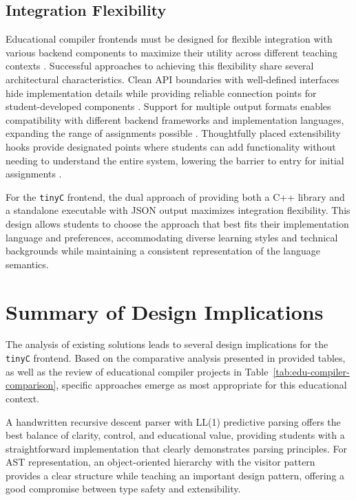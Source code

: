 \subsection{Integration Flexibility}

Educational compiler frontends must be designed for flexible integration with various backend components to maximize their utility across different teaching contexts \cite{jones1997minimal}. Successful approaches to achieving this flexibility share several architectural characteristics. Clean API boundaries with well-defined interfaces hide implementation details while providing reliable connection points for student-developed components \cite{jones1997minimal}. Support for multiple output formats enables compatibility with different backend frameworks and implementation languages, expanding the range of assignments possible \cite{lattner2004llvm}. Thoughtfully placed extensibility hooks provide designated points where students can add functionality without needing to understand the entire system, lowering the barrier to entry for initial assignments \cite{patel2021comparing}.

For the \texttt{tinyC} frontend, the dual approach of providing both a C++ library and a standalone executable with JSON output maximizes integration flexibility. This design allows students to choose the approach that best fits their implementation language and preferences, accommodating diverse learning styles and technical backgrounds while maintaining a consistent representation of the language semantics.

\section{Summary of Design Implications}

The analysis of existing solutions leads to several design implications for the \texttt{tinyC} frontend. Based on the comparative analysis presented in provided tables, as well as the review of educational compiler projects in Table~\ref{tab:edu-compiler-comparison}, specific approaches emerge as most appropriate for this educational context.

A handwritten recursive descent parser with LL(1) predictive parsing offers the best balance of clarity, control, and educational value, providing students with a straightforward implementation that clearly demonstrates parsing principles. For AST representation, an object-oriented hierarchy with the visitor pattern provides a clear structure while teaching an important design pattern, offering a good compromise between type safety and extensibility.

